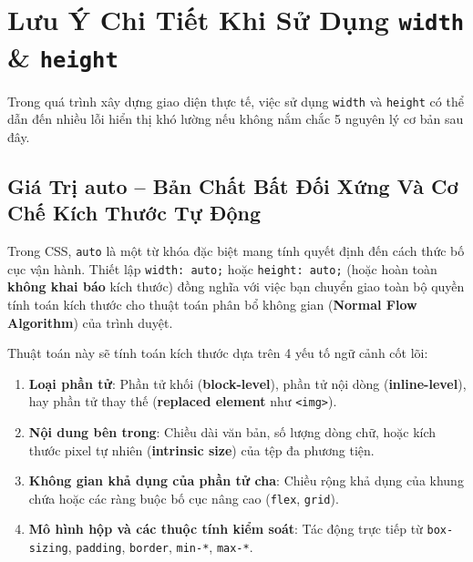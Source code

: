 \documentclass[11pt,oneside]{book}
\newcommand{\codeinline}[1]{\textcolor{accentOrange}{\texttt{#1}}}
\newcommand{\term}[1]{\textbf{\textcolor{primaryBlue}{#1}}}
\DeclareRobustCommand{\csshint}[1]{\texorpdfstring{\textcolor{accentOrange}{\textbf{\texttt{#1}}}}{#1}}
\begin{document}
\section{Lưu Ý Chi Tiết Khi Sử Dụng \csshint{width} \& \csshint{height}}
\label{sec:detailed_width_height_caveats}

Trong quá trình xây dựng giao diện thực tế, việc sử dụng \codeinline{width} và \codeinline{height} có thể dẫn đến nhiều lỗi hiển thị khó lường nếu không nắm chắc 5 nguyên lý cơ bản sau đây.

\subsection{Giá Trị auto – Bản Chất Bất Đối Xứng Và Cơ Chế Kích Thước Tự Động}
\label{subsec:auto_behavior_by_display}

Trong CSS, \codeinline{auto} là một từ khóa đặc biệt mang tính quyết định đến cách thức bố cục vận hành. Thiết lập \codeinline{width: auto;} hoặc \codeinline{height: auto;} (hoặc hoàn toàn \textbf{không khai báo} kích thước) đồng nghĩa với việc bạn chuyển giao toàn bộ quyền tính toán kích thước cho thuật toán phân bổ không gian (\term{Normal Flow Algorithm}) của trình duyệt.

Thuật toán này sẽ tính toán kích thước dựa trên 4 yếu tố ngữ cảnh cốt lõi:
\begin{enumerate}[leftmargin=1.5em, itemsep=2.5pt, parsep=0pt]
    \item \textbf{Loại phần tử}: Phần tử khối (\term{block-level}), phần tử nội dòng (\term{inline-level}), hay phần tử thay thế (\term{replaced element} như \codeinline{<img>}).
    \item \textbf{Nội dung bên trong}: Chiều dài văn bản, số lượng dòng chữ, hoặc kích thước pixel tự nhiên (\term{intrinsic size}) của tệp đa phương tiện.
    \item \textbf{Không gian khả dụng của phần tử cha}: Chiều rộng khả dụng của khung chứa hoặc các ràng buộc bố cục nâng cao (\codeinline{flex}, \codeinline{grid}).
    \item \textbf{Mô hình hộp và các thuộc tính kiểm soát}: Tác động trực tiếp từ \codeinline{box-sizing}, \codeinline{padding}, \codeinline{border}, \codeinline{min-*}, \codeinline{max-*}.
\end{enumerate}
\end{document}
